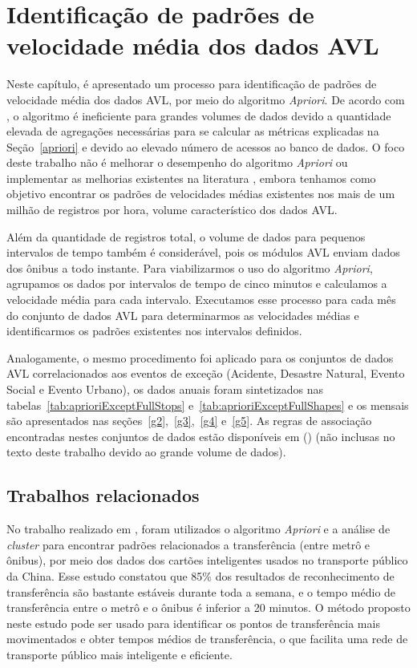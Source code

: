 \documentclass[
	12pt,				%
	oneside,			%
	a4paper,			%
	english,			%
	brazil				%
	]{abntex2ppgsi}
\begin{document}
{{\section{Identificação de padrões de velocidade média dos dados AVL}
\label{expApriori}
Neste capítulo, é apresentado um processo para identificação de padrões de velocidade média dos dados AVL, por meio do algoritmo \textit{Apriori}. De acordo com \cite{xie2008optimization}, o algoritmo é ineficiente para grandes volumes de dados devido a quantidade elevada de agregações necessárias para se calcular as métricas explicadas na Seção~\ref{apriori} e devido ao elevado número de acessos ao banco de dados. O foco deste trabalho não é melhorar o desempenho do algoritmo \textit{Apriori} ou implementar as melhorias existentes na literatura \cite{xie2008optimization, zhang2014method}, embora tenhamos como objetivo encontrar os padrões de velocidades médias existentes nos mais de um milhão de registros por hora, volume característico dos dados AVL.

Além da quantidade de registros total, o volume de dados para pequenos intervalos de tempo também é considerável, pois os módulos AVL enviam dados dos ônibus a todo instante. Para viabilizarmos o uso do algoritmo \textit{Apriori}, agrupamos os dados por intervalos de tempo de cinco minutos e calculamos a velocidade média para cada intervalo. Executamos esse processo para cada mês do conjunto de dados AVL para determinarmos as velocidades médias e identificarmos os padrões existentes nos intervalos definidos.

Analogamente, o mesmo procedimento foi aplicado para os conjuntos de dados AVL correlacionados aos eventos de exceção (Acidente, Desastre Natural, Evento Social e Evento Urbano), os dados anuais foram sintetizados nas tabelas~\ref{tab:aprioriExceptFullStops} e~\ref{tab:aprioriExceptFullShapes} e os mensais são apresentados nas seções~\ref{g2},~\ref{g3},~\ref{g4} e~\ref{g5}. As regras de associação encontradas nestes conjuntos de dados estão disponíveis em \citeauthor{fcas} (\citeyear{fcas}) (não inclusas no texto deste trabalho devido ao  grande volume de dados). 

\subsection{Trabalhos relacionados}

No trabalho realizado em \cite{zhao2019recognizing}, foram utilizados o algoritmo \textit{Apriori} e a análise de \textit{cluster} para encontrar padrões relacionados a transferência (entre metrô e ônibus), por meio dos dados dos cartões inteligentes usados no transporte público da China. Esse estudo constatou que 85\% dos resultados de reconhecimento de transferência são bastante estáveis durante toda a semana, e o tempo médio de transferência entre o metrô e o ônibus é inferior a 20 minutos. O método proposto neste estudo pode ser usado para identificar os pontos de transferência mais movimentados e obter tempos médios de transferência, o que facilita uma rede de transporte público mais inteligente e eficiente.

}}
\end{document}
